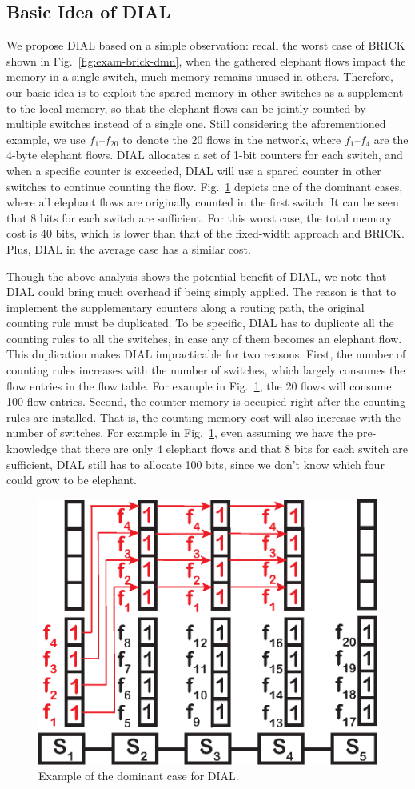 \subsection{Basic Idea of DIAL}\label{sec:to-idea}
We propose DIAL based on a simple observation:
recall the worst case of BRICK shown in Fig.~\ref{fig:exam-brick-dmn}, when the gathered elephant flows impact the memory in a single switch, much memory remains unused in others.
Therefore, our basic idea is to exploit the spared memory in other switches as a supplement to the local memory, so that the elephant flows can be jointly counted by multiple switches instead of a single one.
Still considering the aforementioned example, we use $f_1$--$f_{20}$ to denote the 20 flows in the network, where $f_1$--$f_4$ are the 4-byte elephant flows.
DIAL allocates a set of 1-bit counters for each switch, and when a specific counter is exceeded, DIAL will use a spared counter in other switches to continue counting the flow.
Fig.~\ref{fig:exam-dial-dmn8} depicts one of the dominant cases, where all elephant flows are originally counted in the first switch.
It can be seen that 8 bits for each switch are sufficient.
For this worst case, the total memory cost is 40 bits, which is lower than that of the fixed-width approach and BRICK.
Plus, DIAL in the average case has a similar cost.

Though the above analysis shows the potential benefit of DIAL, we note that DIAL could bring much overhead if being simply applied.
The reason is that to implement the supplementary counters along a routing path, the original counting rule must be duplicated.
To be specific, DIAL has to duplicate all the counting rules to all the switches, in case any of them becomes an elephant flow.
This duplication makes DIAL impracticable for two reasons.
First, the number of counting rules increases with the number of switches, which largely consumes the flow entries in the flow table.
For example in Fig.~\ref{fig:exam-dial-dmn8}, the 20 flows will consume 100 flow entries.
Second, the counter memory is occupied right after the counting rules are installed.
That is, the counting memory cost will also increase with the number of switches.
For example in Fig.~\ref{fig:exam-dial-dmn8}, even assuming we have the pre-knowledge that there are only 4 elephant flows and that 8 bits for each switch are sufficient, DIAL still has to allocate 100 bits, since we don't know which four could grow to be elephant.

\begin{figure}[t]
    \centering
    \includegraphics[width=0.6\linewidth]{pic/exam-dial-dmn8}
    \vspace{-0.1in}
    \caption{Example of the dominant case for DIAL.}
    \label{fig:exam-dial-dmn8}
    \vspace{-0.25in}
\end{figure}
